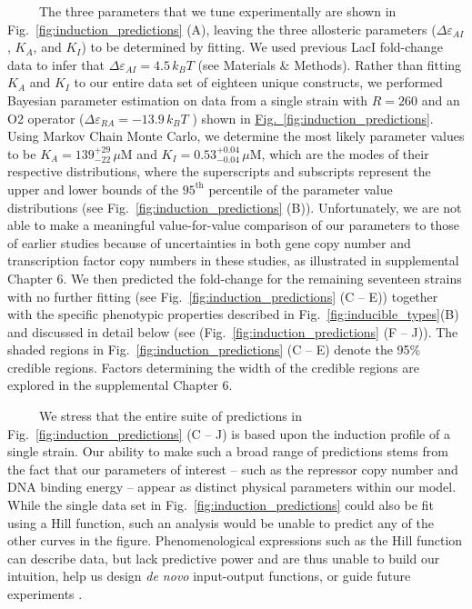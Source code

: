 \documentclass[12pt]{caltech_thesis}
\begin{document}
~~~~~The three parameters that we tune experimentally are shown in
Fig.~\ref{fig:induction_predictions} (A), leaving the three allosteric
parameters (\(\Delta \varepsilon_{AI}\), \(K_A\), and \(K_I\)) to be
determined by fitting. We used previous LacI fold-change data
\autocite{brewster2014} to infer that
\(\Delta\varepsilon_{AI} = 4.5\, k_BT\) (see Materials \& Methods).
Rather than fitting \(K_A\) and \(K_I\) to our entire data set of
eighteen unique constructs, we performed Bayesian parameter estimation
on data from a single strain with \(R=260\) and an O2 operator
(\(\Delta\varepsilon_{RA}=-13.9\,k_BT\) \autocite{garcia2011}) shown in
\href{D,\%20white-faced\%20points}{Fig.~\ref{fig:induction_predictions}}.
Using Markov Chain Monte Carlo, we determine the most likely parameter
values to be \(K_A=139^{+29}_{-22}\, \mu\)M and
\(K_I=0.53^{+0.04}_{-0.04}\, \mu\)M, which are the modes of their
respective distributions, where the superscripts and subscripts
represent the upper and lower bounds of the \(95^\text{th}\) percentile
of the parameter value distributions (see
Fig.~\ref{fig:induction_predictions} (B)). Unfortunately, we are not
able to make a meaningful value-for-value comparison of our parameters
to those of earlier studies \autocite{daber2009a,daber2011} because of
uncertainties in both gene copy number and transcription factor copy
numbers in these studies, as illustrated in supplemental Chapter 6. We
then predicted the fold-change for the remaining seventeen strains with
no further fitting (see Fig.~\ref{fig:induction_predictions} (C -- E))
together with the specific phenotypic properties described in
Fig.~\ref{fig:inducible_types}(B) and discussed in detail below (see
(Fig.~\ref{fig:induction_predictions} (F -- J)). The shaded regions in
Fig.~\ref{fig:induction_predictions} (C -- E) denote the 95\% credible
regions. Factors determining the width of the credible regions are
explored in the supplemental Chapter 6.

~~~~~We stress that the entire suite of predictions in
Fig.~\ref{fig:induction_predictions} (C -- J) is based upon the
induction profile of a single strain. Our ability to make such a broad
range of predictions stems from the fact that our parameters of interest
-- such as the repressor copy number and DNA binding energy -- appear as
distinct physical parameters within our model. While the single data set
in Fig.~\ref{fig:induction_predictions} could also be fit using a Hill
function, such an analysis would be unable to predict any of the other
curves in the figure. Phenomenological expressions such as the Hill
function can describe data, but lack predictive power and are thus
unable to build our intuition, help us design \emph{de novo}
input-output functions, or guide future experiments
\autocite{kuhlman2007,murphy2007}.
\end{document}
